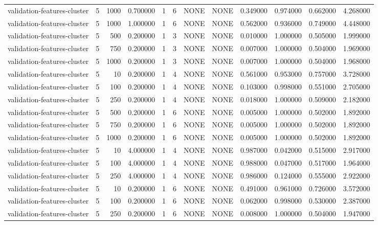 \begin{tabular}{lrrrllllrrrr}
validation-features-cluster & 5 & 1000 & 0.700000 & 1 & 6 & NONE & NONE & 0.349000 & 0.974000 & 0.662000 & 4.268000 \\
validation-features-cluster & 5 & 1000 & 1.000000 & 1 & 6 & NONE & NONE & 0.562000 & 0.936000 & 0.749000 & 4.448000 \\
validation-features-cluster & 5 & 500 & 0.200000 & 1 & 3 & NONE & NONE & 0.010000 & 1.000000 & 0.505000 & 1.999000 \\
validation-features-cluster & 5 & 750 & 0.200000 & 1 & 3 & NONE & NONE & 0.007000 & 1.000000 & 0.504000 & 1.969000 \\
validation-features-cluster & 5 & 1000 & 0.200000 & 1 & 3 & NONE & NONE & 0.007000 & 1.000000 & 0.504000 & 1.968000 \\
validation-features-cluster & 5 & 10 & 0.200000 & 1 & 4 & NONE & NONE & 0.561000 & 0.953000 & 0.757000 & 3.728000 \\
validation-features-cluster & 5 & 100 & 0.200000 & 1 & 4 & NONE & NONE & 0.103000 & 0.998000 & 0.551000 & 2.705000 \\
validation-features-cluster & 5 & 250 & 0.200000 & 1 & 4 & NONE & NONE & 0.018000 & 1.000000 & 0.509000 & 2.182000 \\
validation-features-cluster & 5 & 500 & 0.200000 & 1 & 6 & NONE & NONE & 0.005000 & 1.000000 & 0.502000 & 1.892000 \\
validation-features-cluster & 5 & 750 & 0.200000 & 1 & 6 & NONE & NONE & 0.005000 & 1.000000 & 0.502000 & 1.892000 \\
validation-features-cluster & 5 & 1000 & 0.200000 & 1 & 6 & NONE & NONE & 0.005000 & 1.000000 & 0.502000 & 1.892000 \\
validation-features-cluster & 5 & 10 & 4.000000 & 1 & 4 & NONE & NONE & 0.987000 & 0.042000 & 0.515000 & 2.917000 \\
validation-features-cluster & 5 & 100 & 4.000000 & 1 & 4 & NONE & NONE & 0.988000 & 0.047000 & 0.517000 & 1.964000 \\
validation-features-cluster & 5 & 250 & 4.000000 & 1 & 4 & NONE & NONE & 0.986000 & 0.124000 & 0.555000 & 2.922000 \\
validation-features-cluster & 5 & 10 & 0.200000 & 1 & 6 & NONE & NONE & 0.491000 & 0.961000 & 0.726000 & 3.572000 \\
validation-features-cluster & 5 & 100 & 0.200000 & 1 & 6 & NONE & NONE & 0.062000 & 0.998000 & 0.530000 & 2.387000 \\
validation-features-cluster & 5 & 250 & 0.200000 & 1 & 6 & NONE & NONE & 0.008000 & 1.000000 & 0.504000 & 1.947000 \\

\end{tabular}
